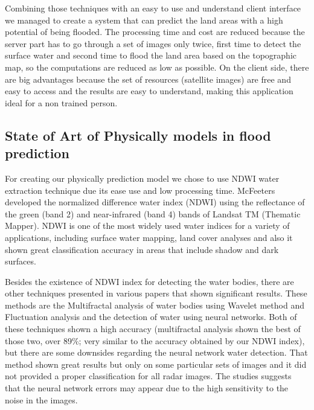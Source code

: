 \documentclass[12pt, a4paper]{report}
\begin{document}
Combining those techniques with an easy to use and understand client interface we managed to create a system that can predict the land areas with a high potential of being flooded. The processing time and cost are reduced because the server part has to go through a set of images only twice, first time to detect the surface water and second time to flood the land area based on the topographic map, so the computations are reduced as low as possible. On the client side, there are big advantages because the set of resources (satellite images) are free and easy to access and the results are easy to understand, making this application ideal for a non trained person.
\par





\subsection{State of Art of Physically models in flood prediction}

\quad
For creating our physically prediction model we chose to use NDWI water extraction technique due its ease use and low processing time. McFeeters \cite{McFeeters} developed the normalized difference water index (NDWI) using the reflectance of the green (band 2) and near-infrared (band 4) bands of Landsat TM (Thematic Mapper). NDWI is one of the most widely used water indices for a variety of applications, including surface water mapping, land cover analyses \cite{Duan, Poulin, Hui} and also it shown great classification accuracy in areas that include shadow and dark surfaces.
\par 

Besides the existence of NDWI index for detecting the water bodies, there are other techniques presented in various papers \cite{Multifractal water analysis, NDWI Comparison} that shown significant results. These methods are the Multifractal analysis of water bodies using Wavelet method and Fluctuation analysis and the detection of water using neural networks. Both of these techniques shown a high accuracy (multifractal analysis shown the best of those two, over 89\%; very similar to the accuracy obtained by our NDWI index), but there are some downsides regarding the neural network water detection. That method shown great results but only on some particular sets of images and it did not provided a proper classification for all radar images. The studies \cite{NDWI Comparison} suggests that the neural network errors may appear due to the high sensitivity to the noise in the images. 
\par 
\end{document}
